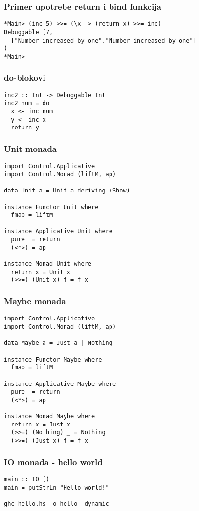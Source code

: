 \documentclass{beamer}
\begin{document}
\begin{frame}[fragile]
\frametitle{Primer upotrebe return i bind funkcija}
\begin{lstlisting}
*Main> (inc 5) >>= (\x -> (return x) >>= inc)
Debuggable (7,
  ["Number increased by one","Number increased by one"]
)
*Main>
\end{lstlisting}
\end{frame}

\begin{frame}[fragile]
\frametitle{do-blokovi}
\begin{lstlisting}
inc2 :: Int -> Debuggable Int 
inc2 num = do 
  x <- inc num
  y <- inc x 
  return y 
\end{lstlisting}
\end{frame}

\begin{frame}[fragile]
\frametitle{Unit monada}
\begin{lstlisting}
import Control.Applicative 
import Control.Monad (liftM, ap)

data Unit a = Unit a deriving (Show)

instance Functor Unit where
  fmap = liftM

instance Applicative Unit where
  pure  = return
  (<*>) = ap

instance Monad Unit where 
  return x = Unit x
  (>>=) (Unit x) f = f x
\end{lstlisting}
\end{frame}

\begin{frame}[fragile]
\frametitle{Maybe monada}
\begin{lstlisting}
import Control.Applicative 
import Control.Monad (liftM, ap)

data Maybe a = Just a | Nothing

instance Functor Maybe where
  fmap = liftM

instance Applicative Maybe where
  pure  = return
  (<*>) = ap

instance Monad Maybe where 
  return x = Just x
  (>>=) (Nothing) _ = Nothing
  (>>=) (Just x) f = f x
\end{lstlisting}
\end{frame}

\begin{frame}[fragile]
\frametitle{IO monada - hello world}
\begin{lstlisting}
main :: IO ()
main = putStrLn "Hello world!" 

ghc hello.hs -o hello -dynamic 

\end{lstlisting}
\end{frame}
\end{document}
